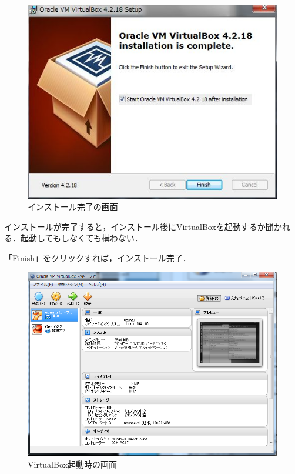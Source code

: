 \begin{figure}[H]
\centering
\includegraphics[width=13cm]{install_finish.jpg}
\caption{インストール完了の画面}\label{サンプル図}
\end{figure}

インストールが完了すると，インストール後にVirtualBoxを起動するか聞かれる．起動してもしなくても構わない．

「Finish」をクリックすれば，インストール完了．


\begin{figure}[H]
\centering
\includegraphics[width=13cm]{VirtualBox_start.png}
\caption{VirtualBox起動時の画面}\label{サンプル図}
\end{figure}


